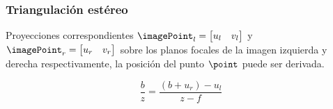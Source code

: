 \begin{frame}
\frametitle{Triangulación estéreo}

Proyecciones correspondientes $\imagePoint_{l}=\begin{bmatrix}u_{l} & v_{l}\end{bmatrix}$ y $\imagePoint_{r}=\begin{bmatrix}u_{r} & v_{r}\end{bmatrix}$ sobre los planos focales de la imagen izquierda y derecha respectivamente,
la posición del punto $\point$ puede ser derivada.

\begin{equation}
\frac{b}{z}=\frac{(b+u_{r})-u_{l}}{z-f}
\end{equation}

\begin{figure}[!htb]
	\centering
	\hfill
	\centering
	\hfill
\end{figure}
\end{frame}


